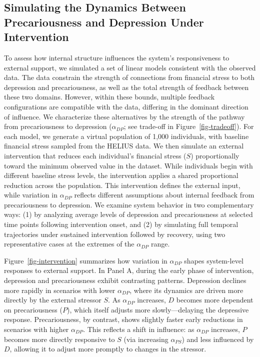 \documentclass[
]{article}
\begin{document}
\restoregeometry

\subsection{Simulating the Dynamics Between Precariousness and
Depression Under
Intervention}\label{simulating-the-dynamics-between-precariousness-and-depression-under-intervention}

To assess how internal structure influences the system's responsiveness
to external support, we simulated a set of linear models consistent with
the observed data. The data constrain the strength of connections from
financial stress to both depression and precariousness, as well as the
total strength of feedback between these two domains. However, within
these bounds, multiple feedback configurations are compatible with the
data, differing in the dominant direction of influence. We characterize
these alternatives by the strength of the pathway from precariousness to
depression (\(\alpha_{DP}\); see trade-off in
Figure~\ref{fig-tradeoff}). For each model, we generate a virtual
population of 1,000 individuals, with baseline financial stress sampled
from the HELIUS data. We then simulate an external intervention that
reduces each individual's financial stress (\(S\)) proportionally toward
the minimum observed value in the dataset. While individuals begin with
different baseline stress levels, the intervention applies a shared
proportional reduction across the population. This intervention defines
the external input, while variation in \(\alpha_{DP}\) reflects
different assumptions about internal feedback from precariousness to
depression. We examine system behavior in two complementary ways: (1) by
analyzing average levels of depression and precariousness at selected
time points following intervention onset, and (2) by simulating full
temporal trajectories under sustained intervention followed by recovery,
using two representative cases at the extremes of the \(\alpha_{DP}\)
range.

Figure~\ref{fig-intervention} summarizes how variation in
\(\alpha_{DP}\) shapes system-level responses to external support. In
Panel A, during the early phase of intervention, depression and
precariousness exhibit contrasting patterns. Depression declines more
rapidly in scenarios with lower \(\alpha_{DP}\), where its dynamics are
driven more directly by the external stressor \(S\). As \(\alpha_{DP}\)
increases, \(D\) becomes more dependent on precariousness (\(P\)), which
itself adjusts more slowly---delaying the depressive response.
Precariousness, by contrast, shows slightly faster early reductions in
scenarios with higher \(\alpha_{DP}\). This reflects a shift in
influence: as \(\alpha_{DP}\) increases, \(P\) becomes more directly
responsive to \(S\) (via increasing \(\alpha_{PS}\)) and less influenced
by \(D\), allowing it to adjust more promptly to changes in the
stressor.
\end{document}
